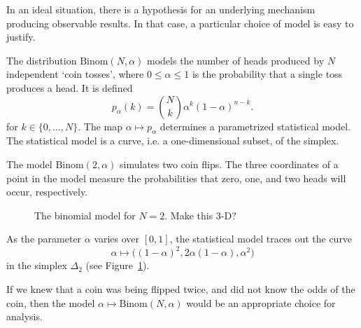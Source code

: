 \documentclass[cclicense]{hmcthesis}
\numberwithin{equation}{chapter}
\numberwithin{thmcounter}{chapter}
\begin{document}
    In an ideal situation, there is a hypothesis for an underlying mechanism
    producing observable results.  In that case, a particular choice of model is
    easy to justify.

    \begin{example}
    The distribution $\mathrm{Binom}(N, \alpha)$ models the number of heads
    produced by $N$ independent `coin tosses', where $0 \le \alpha \le 1$ is
    the probability that a single toss produces a head.  It is defined
    \[
        p_\alpha(k) = {N \choose k} \alpha^k(1-\alpha)^{n-k}.
    \]
    for $k \in \{0, \ldots, N\}$.  The map $\alpha \mapsto p_\alpha$
    determines a parametrized statistical model.  The statistical model is a
    curve, i.e. a one-dimensional subset, of the simplex.  

    The model $\mathrm{Binom}(2, \alpha)$ simulates two coin flips.  The three
    coordinates of a point in the model measure the probabilities that zero,
    one, and two heads will occur, respectively.
    \begin{figure}[H]
        \centering
        \vspace*{-0.2cm}
        \vspace*{-0.5cm}
        \caption{The binomial model for $N=2$. Make this 3-D?}
        \label{fig:binomial}
    \end{figure}
    \noindent As the parameter $\alpha$ varies over $[0,1]$, the statistical
    model traces out the curve 
    \[
        \alpha \longmapsto \big((1-\alpha)^2, 2\alpha(1-\alpha), \alpha^2\big)
    \]
    in the simplex $\Delta_2$ (see Figure~\ref{fig:binomial}).  

    If we knew that a coin was being flipped twice, and did not know the odds of
    the coin, then the model $\alpha \mapsto \mathrm{Binom}(N, \alpha)$ would be
    an appropriate choice for analysis.
    \end{example}
\end{document}
